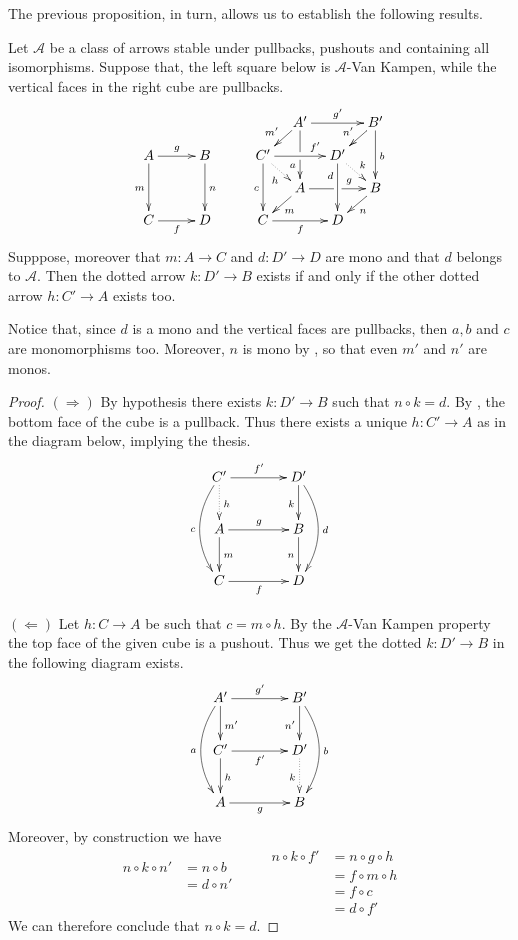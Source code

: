 The previous proposition, in turn, allows us to establish the following results.
\begin{lemma}\label{lem:varie}Let $\mathcal{A}$ be a class of arrows stable under pullbacks, pushouts and containing all isomorphisms.  Suppose that, the left square below is $\mathcal{A}$-Van Kampen, while the vertical faces in the right cube are pullbacks.
		\[\xymatrix@C=10pt@R=10pt{&&&&&A'\ar[dd]|\hole_(.65){a}\ar[rr]^{g'} \ar[dl]_{m'} && B' \ar[dd]^{b} \ar[dl]_{n'} \\ A \ar[dd]_{m}\ar[rr]^{g}&&B\ar[dd]^{n}&&C'  \ar@{.>}[dr]_{h} _{}\ar[dd]_{c}\ar[rr]^(.7){f'} & & D' \ar@{.>}[dr]^{k}\ar[dd]_(.3){d}\\&&&&&A\ar[rr]|\hole^(.65){g} \ar[dl]^{m} && B \ar[dl]^{n} \\C\ar[rr]_{f} &&D&&C \ar[rr]_{f} & & D}\]
Supppose, moreover that $m\colon A\to C$ and $d\colon D'\to D$ are mono and that $d$ belongs to $\mathcal{A}$. Then the dotted arrow  $k\colon D'\to B$ exists if and only if the other dotted arrow  $h\colon C'\to A$ exists too.
\end{lemma}

\begin{remark}
	Notice that, since $d$ is a mono and the vertical faces are pullbacks, then $a, b$ and $c$ are monomorphisms too. Moreover, $n$ is mono by , so that even $m'$ and $n'$ are monos.
\end{remark}

\begin{proof}
	$(\Rightarrow)$ By hypothesis there exists $k:D'\to B$ such that $n\circ k = d$. By , the bottom face of the cube is a pullback. Thus there exists a unique $h:C'\to A$ as in the diagram below, implying the thesis.
		\[\xymatrix@C=40pt{C'  \ar@{.>}[d]^{h}\ar[r]^{f'} \ar@/_.5cm/[dd]_{c}& D' \ar@/^.5cm/[dd]^{d}\ar[d]_{k}\\ A \ar[d]^{m} \ar[r]^{g} & B \ar[d]_{n} \\  C \ar[r]_f & D}\]
	
	\smallskip \noindent 
	$(\Leftarrow)$ Let $h:C\to A$ be such that $c=m\circ h$. By the $\mathcal{A}$-Van Kampen property the top face of the given cube is a pushout. Thus we get  the dotted $k:D'\to B$ in the following diagram exists.
		\[\xymatrix@C=40pt{A' \ar@/_.5cm/[dd]_{a} \ar[d]^{m'} \ar[r]^{g'} & B' \ar[d]_{n'} \ar@/^.5cm/[dd]^{b} \\  C' \ar[d]^{h} \ar[r]_{f'} & D' \ar@{.>}[d]_{k}\\ A \ar[r]_g& B }\]
Moreover, by construction we have
\[\begin{split}
n\circ k \circ n' &= n\circ b\\&=d\circ n'\\&\\&
\end{split} \qquad \begin{split}
n\circ k \circ f' &= n\circ g\circ h\\&=f\circ m\circ h\\&=f\circ c\\&= d\circ f' \end{split}\]
We can therefore conclude that $n\circ k =d$. \qedhere 
\end{proof}


